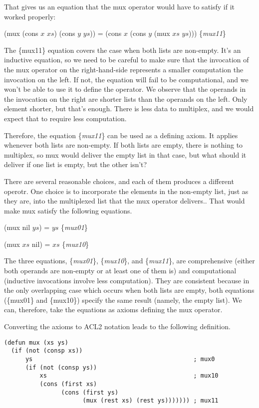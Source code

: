 That gives us an equation that the mux operator
would have to satisfy if it worked properly:

\hspace{1cm} (mux (cons $x$ $xs$) (cons $y$ $ys$)) = (cons $x$ (cons $y$ (mux $xs$ $ys$)))
\hfill \{\emph{mux11}\}

The \{mux11\} equation covers the case when both lists are non-empty.
It's an inductive equation, so we need to be careful to make sure
that the invocation of the mux operator on the right-hand-side
represents a smaller computation the invocation on the left.
If not, the equation will fail to be computational, and
we won't be able to use it to define the operator.
We observe that the operands in the invocation on the
right are shorter lists than the operands on the left.
Only  element shorter, but that's enough.
There is less data to multiplex,
and we would expect that to require less computation.

Therefore, the equation \{\emph{mux11}\} can be used
as a defining axiom. It applies whenever both lists are non-empty.
If both lists are empty, there is nothing to multiplex,
so mux would deliver the empty list in that case, but
what should it deliver if one list is empty, but the other isn't?

There are several reasonable choices, and each of them produces
a different operotr. One choice is to incorporate the elements
in the non-empty list, just as they are, into the
multiplexed list that the mux operator delivers..
That would make mux satisfy the following equations.

\hspace{1cm} (mux nil $ys$) = $ys$ \hfill \{\emph{mux01}\}

\hspace{1cm} (mux $xs$ nil) = $xs$ \hfill \{\emph{mux10}\}

\label{def:mux}
The three equations, \{\emph{mux01}\}, \{\emph{mux10}\}, and \{\emph{mux11}\},
are comprehensive (either both operands are non-empty
or at least one of them is) and computational
(inductive invocations involve less computation).
They are consistent because in the only overlapping case
which occurs
when both lists are empty, both equations
(\{mux01\} and \{mux10\}) specify the same result
(namely, the empty list).
We can, therefore, take the equations as axioms
defining the mux operator.

Converting the axioms to ACL2 notation leads to the following
definition.

\label{mux-defun}
\begin{Verbatim}
(defun mux (xs ys)
  (if (not (consp xs))
      ys                                             ; mux0
      (if (not (consp ys))
          xs                                         ; mux10
          (cons (first xs)
                (cons (first ys)
                      (mux (rest xs) (rest ys))))))) ; mux11
\end{Verbatim}

